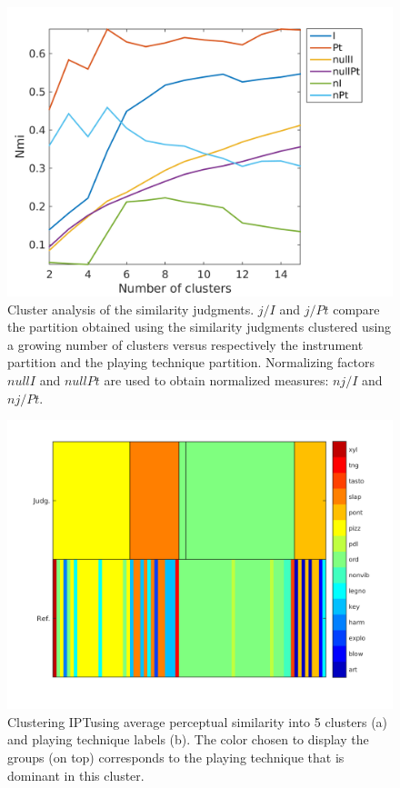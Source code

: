 \documentclass{article}
\newcommand{\ipt}{IPT}
\begin{document}
\begin{figure}
\center
\includegraphics[width = \textwidth]{figures/clusterAnalysis.png}
\caption{Cluster analysis of the similarity judgments. $j/I$ and $j/Pt$ compare the partition obtained using the similarity judgments clustered using a growing number of clusters versus respectively the instrument partition and the playing technique partition. Normalizing factors $nullI$ and $nullPt$ are used to obtain normalized measures: $nj/I$ and $nj/Pt$.}
\label{fig:clusters}
\end{figure}

\begin{figure}
\center
\includegraphics[width = \textwidth]{figures/groupModes.png}
\caption{Clustering \ipt using average perceptual similarity into 5 clusters (a) and playing technique labels (b). The color chosen to display the groups (on top) corresponds to the playing technique that is dominant in this cluster.}
\label{fig:gm}
\end{figure}
\end{document}
